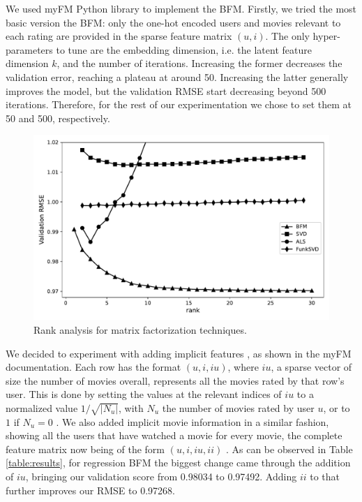 \documentclass[sigconf]{acmart}
\begin{document}
We used myFM Python library \cite{myFM} to implement the BFM.%
Firstly, we tried the most basic version the BFM: only the one-hot encoded users and movies relevant to each rating are provided in the sparse feature matrix $(u, i)$. 
The only hyper-parameters to tune are the embedding dimension, i.e. the latent feature dimension $k$, and the number of iterations. Increasing the former decreases the validation error, reaching a plateau at around 50. Increasing the latter
generally improves the model, but the validation RMSE start decreasing beyond 500 iterations.  Therefore, for the rest of our experimentation we chose to set them at 50 and 500, respectively.

\begin{figure}[!b]
    \centering
    \includegraphics[width=.9\columnwidth]{Images/rank_analysis.pdf}
    \caption{Rank analysis for matrix factorization techniques.}
    \label{fig:rankanalysis}
\end{figure}

We decided to experiment with adding implicit features \cite{Oard1998ImplicitFF}, as shown in the myFM \cite{myFM} documentation. 
Each row has the format $(u, i, iu)$, where $iu$, a sparse vector of size the number of movies overall, represents all the movies rated by that row's user. This is done by setting the values at the relevant indices of $iu$ to a normalized value $1/\sqrt{\left|N_u\right|}$, with $N_u$ the number of movies rated by user $u$, or to $1$ if $N_u = 0$ \cite{Koren2008FactorizationMT}. We also added implicit movie information in a similar fashion, showing all the users that have watched a movie for every movie, the complete feature matrix now being of the form $(u, i, iu, ii)$ \cite{onthediffic}. As can be observed in Table \ref{table:results}, for regression BFM the biggest change came through the addition of $iu$, bringing our validation score from 0.98034 to 0.97492. Adding $ii$ to that further improves our RMSE to 0.97268.
\end{document}
